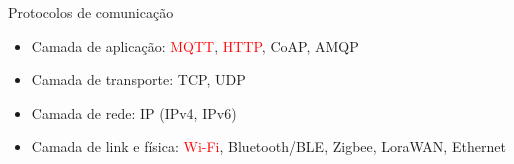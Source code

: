 \begin{frame}{Protocolos de comunicação}
    \begin{itemize}
        \item Camada de aplicação: \textcolor{red}{MQTT}, \textcolor{red}{HTTP}, CoAP, AMQP
        \item Camada de transporte: TCP, UDP
        \item Camada de rede: IP (IPv4, IPv6)
        \item Camada de link e física: \textcolor{red}{Wi-Fi}, Bluetooth/BLE, Zigbee, LoraWAN, Ethernet
    \end{itemize}
\end{frame}